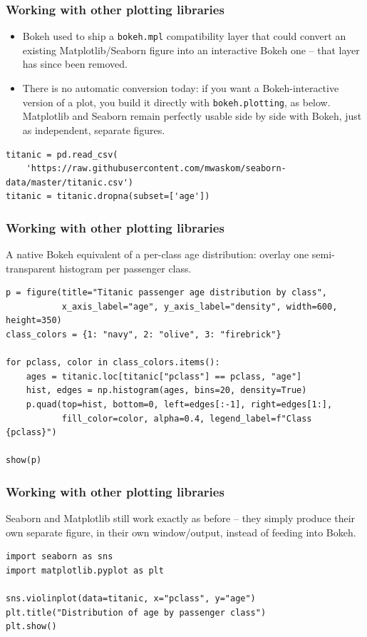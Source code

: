 \begin{frame}[fragile] \frametitle{Working with other plotting libraries}
\begin{itemize}
\item Bokeh used to ship a \texttt{bokeh.mpl} compatibility layer that could convert an existing Matplotlib/Seaborn figure into an interactive Bokeh one -- that layer has since been removed.
\item There is no automatic conversion today: if you want a Bokeh-interactive version of a plot, you build it directly with \texttt{bokeh.plotting}, as below. Matplotlib and Seaborn remain perfectly usable side by side with Bokeh, just as independent, separate figures.
\end{itemize}
\begin{lstlisting}
titanic = pd.read_csv(
    'https://raw.githubusercontent.com/mwaskom/seaborn-data/master/titanic.csv')
titanic = titanic.dropna(subset=['age'])
\end{lstlisting}
\end{frame}

\begin{frame}[fragile] \frametitle{Working with other plotting libraries}
A native Bokeh equivalent of a per-class age distribution: overlay one semi-transparent histogram per passenger class.
\begin{lstlisting}
p = figure(title="Titanic passenger age distribution by class",
           x_axis_label="age", y_axis_label="density", width=600, height=350)
class_colors = {1: "navy", 2: "olive", 3: "firebrick"}

for pclass, color in class_colors.items():
    ages = titanic.loc[titanic["pclass"] == pclass, "age"]
    hist, edges = np.histogram(ages, bins=20, density=True)
    p.quad(top=hist, bottom=0, left=edges[:-1], right=edges[1:],
           fill_color=color, alpha=0.4, legend_label=f"Class {pclass}")

show(p)
\end{lstlisting}
\end{frame}

\begin{frame}[fragile] \frametitle{Working with other plotting libraries}
Seaborn and Matplotlib still work exactly as before -- they simply produce their own separate figure, in their own window/output, instead of feeding into Bokeh.
\begin{lstlisting}
import seaborn as sns
import matplotlib.pyplot as plt

sns.violinplot(data=titanic, x="pclass", y="age")
plt.title("Distribution of age by passenger class")
plt.show()
\end{lstlisting}
\end{frame}

